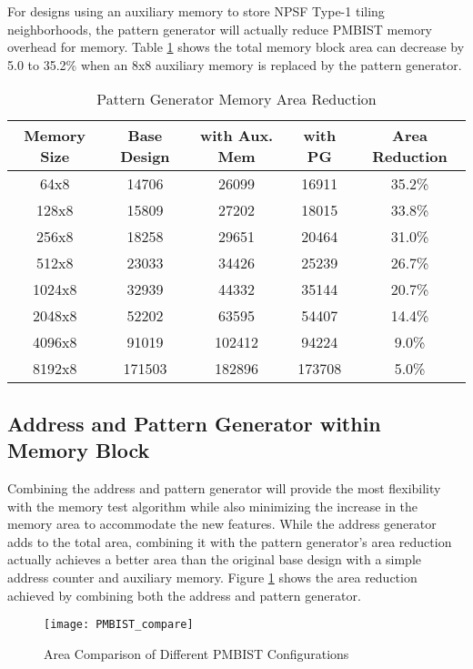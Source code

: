 For designs using an auxiliary memory to store NPSF Type-1 tiling neighborhoods, the pattern generator will actually reduce PMBIST memory overhead for memory.  Table \ref{tab:pg_memory_overhead} shows the total memory block area can decrease by 5.0 to 35.2\% when an 8x8 auxiliary memory is replaced by the pattern generator.  

\begin{table}[H]
\caption{Pattern Generator Memory Area Reduction}
\centering
\begin{tabular}{|c| c| c| c| c|}
\hline
Memory Size & Base Design & with Aux. Mem & with PG & Area Reduction \\
\hline\hline
64x8   & 14706  & 26099  & 16911  & 35.2\% \\
128x8  & 15809  & 27202  & 18015  & 33.8\% \\
256x8  & 18258  & 29651  & 20464  & 31.0\% \\
512x8  & 23033  & 34426  & 25239  & 26.7\% \\
1024x8 & 32939  & 44332  & 35144  & 20.7\% \\
2048x8 & 52202  & 63595  & 54407  & 14.4\% \\
4096x8 & 91019  & 102412 & 94224  &  9.0\% \\
8192x8 & 171503 & 182896 & 173708 &  5.0\% \\ [0.5ex]
\hline
\end{tabular}
\label{tab:pg_memory_overhead}
\end{table}

\subsection{Address and Pattern Generator within Memory Block}
Combining the address and pattern generator will provide the most flexibility with the memory test algorithm while also minimizing the increase in the memory area to accommodate the new features.  While the address generator adds to the total area, combining it with the pattern generator's area reduction actually achieves a better area than the original base design with a simple address counter and auxiliary memory.  Figure \ref{fig:all_compare} shows the area reduction achieved by combining both the address and pattern generator.

\begin{figure}[h]
  \centering
  \texttt{[image: PMBIST\_compare]}
  \caption{Area Comparison of Different PMBIST Configurations}
  \label{fig:all_compare}
\end{figure}

